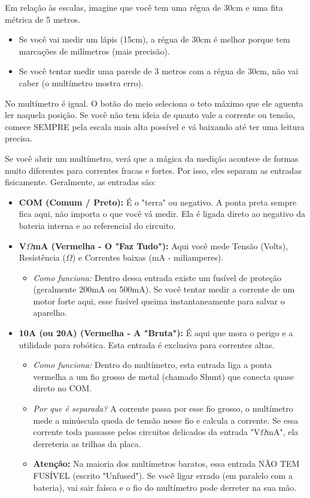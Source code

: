 \documentclass[lang=pt,11pt]{elegantbook}
\begin{document}
Em relação às escalas, imagine que você tem uma régua de 30cm e uma fita métrica de 5 metros.

\begin{itemize}
	\item Se você vai medir um lápis (15cm), a régua de 30cm é melhor porque tem marcações de milímetros (mais precisão).
	\item Se você tentar medir uma parede de 3 metros com a régua de 30cm, não vai caber (o multímetro mostra erro).
\end{itemize}

No multímetro é igual. O botão do meio seleciona o teto máximo que ele aguenta ler naquela posição. Se você não tem ideia de quanto vale a corrente ou tensão, comece SEMPRE pela escala mais alta possível e vá baixando até ter uma leitura precisa.

Se você abrir um multímetro, verá que a mágica da medição acontece de formas muito diferentes para correntes fracas e fortes. Por isso, eles separam as entradas fisicamente. Geralmente, as entradas são:

\begin{itemize}
    \item \textbf{COM (Comum / Preto):} É o "terra" ou negativo. A ponta preta sempre fica aqui, não importa o que você vá medir. Ela é ligada direto ao negativo da bateria interna e ao referencial do circuito.
    \item \textbf{V$\Omega$mA (Vermelha - O "Faz Tudo"):} Aqui você mede Tensão (Volts), Resistência ($\Omega$) e Correntes baixas (mA - miliamperes).
    \begin{itemize}
        \item \textit{Como funciona:} Dentro dessa entrada existe um fusível de proteção (geralmente 200mA ou 500mA). Se você tentar medir a corrente de um motor forte aqui, esse fusível queima instantaneamente para salvar o aparelho.
    \end{itemize}
    \item \textbf{10A (ou 20A) (Vermelha - A "Bruta"):} É aqui que mora o perigo e a utilidade para robótica. Esta entrada é exclusiva para correntes altas.
    \begin{itemize}
        \item \textit{Como funciona:} Dentro do multímetro, esta entrada liga a ponta vermelha a um fio grosso de metal (chamado Shunt) que conecta quase direto no COM.
        \item \textit{Por que é separada?} A corrente passa por esse fio grosso, o multímetro mede a minúscula queda de tensão nesse fio e calcula a corrente. Se essa corrente toda passasse pelos circuitos delicados da entrada "V$\Omega$mA", ela derreteria as trilhas da placa.
        \item \textbf{Atenção:} Na maioria dos multímetros baratos, essa entrada NÃO TEM FUSÍVEL (escrito "Unfused"). Se você ligar errado (em paralelo com a bateria), vai sair faísca e o fio do multímetro pode derreter na sua mão.
    \end{itemize}
\end{itemize}
\end{document}
